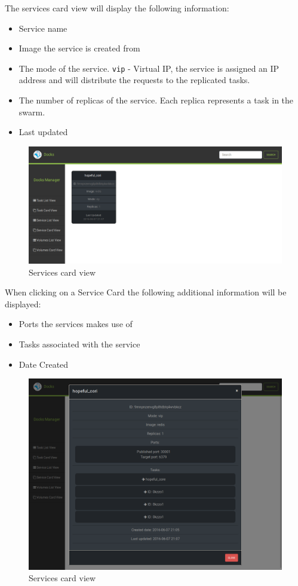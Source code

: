 \documentclass[]{article}
\providecommand{\tightlist}{%
	\setlength{\itemsep}{0pt}\setlength{\parskip}{0pt}}
\let\oldtexttt\texttt
\renewcommand{\texttt}[1]{
	\colorbox{Light}{\oldtexttt{#1}}
}
\begin{document}
The services card view will display the following information:
\begin{itemize}
	\tightlist
	\item Service name
	\item Image the service is created from
	\item The mode of the service. \texttt{vip} - Virtual IP, the service is assigned an IP address and will distribute the requests to the replicated tasks.
	\item The number of replicas of the service. Each replica represents a task in the swarm.
	\item Last updated
\end{itemize}

\begin{figure}[H]
	\centering
	\includegraphics[scale=0.4]{service_card_view.png}
	\caption{Services card view}
\end{figure}

When clicking on a Service Card the following additional information will be displayed:
\begin{itemize}
	\tightlist
	\item Ports the services makes use of
	\item Tasks associated with the service
	\item Date Created
\end{itemize}

\begin{figure}[H]
	\centering
	\includegraphics[scale=0.4]{service_card_modal.png}
	\caption{Services card view}
\end{figure}
\end{document}
